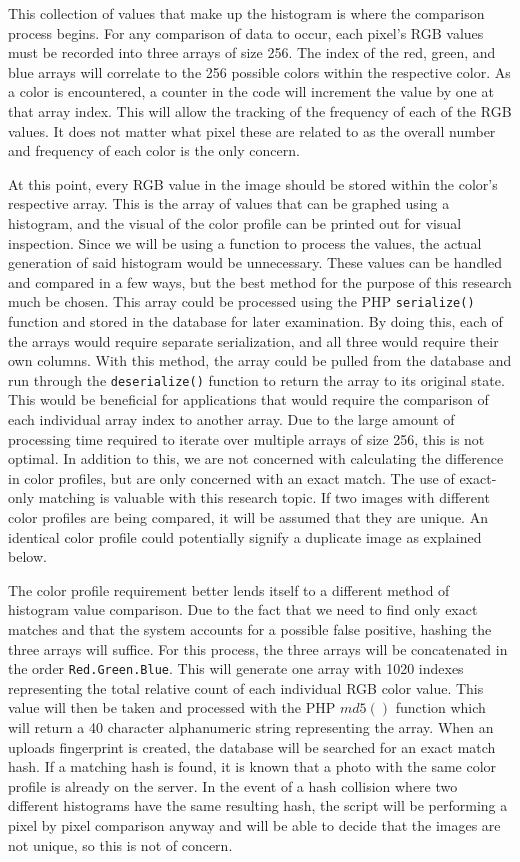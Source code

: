 This collection of values that make up the histogram is where the comparison process begins. For any comparison of data to occur, each pixel's RGB values must be recorded into three arrays of size 256. The index of the red, green, and blue arrays will correlate to the 256 possible colors within the respective color. As a color is encountered, a counter in the code will increment the value by one at that array index. This will allow the tracking of the frequency of each of the RGB values. It does not matter what pixel these are related to as the overall number and frequency of each color is the only concern.

At this point, every RGB value in the image should be stored within the color's respective array. This is the array of values that can be graphed using a histogram, and the visual of the color profile can be printed out for visual inspection. Since we will be using a function to process the values, the actual generation of said histogram would be unnecessary. These values can be handled and compared in a few ways, but the best method for the purpose of this research much be chosen. This array could be processed using the PHP {\tt serialize()} function and stored in the database for later examination. By doing this, each of the arrays would require separate serialization, and all three would require their own columns. With this method, the array could be pulled from the database and run through the {\tt deserialize()} function to return the array to its original state. This would be beneficial for applications that would require the comparison of each individual array index to another array. Due to the large amount of processing time required to iterate over multiple arrays of size 256, this is not optimal. In addition to this, we are not concerned with calculating the difference in color profiles, but are only concerned with an exact match. The use of exact-only matching is valuable with this research topic. If two images with different color profiles are being compared, it will be assumed that they are unique. An identical color profile could potentially signify a duplicate image as explained below.

The color profile requirement better lends itself to a different method of histogram value comparison. Due to the fact that we need to find only exact matches and that the system accounts for a possible false positive, hashing the three arrays will suffice. For this process, the three arrays will be concatenated in the order {\tt Red.Green.Blue}. This will generate one array with 1020 indexes representing the total relative count of each individual RGB color value. This value will then be taken and processed with the PHP $md5()$ function which will return a 40 character alphanumeric string representing the array. When an uploads fingerprint is created, the database will be searched for an exact match hash. If a matching hash is found, it is known that a photo with the same color profile is already on the server. In the event of a hash collision where two different histograms have the same resulting hash, the script will be performing a pixel by pixel comparison anyway and will be able to decide that the images are not unique, so this is not of concern.

